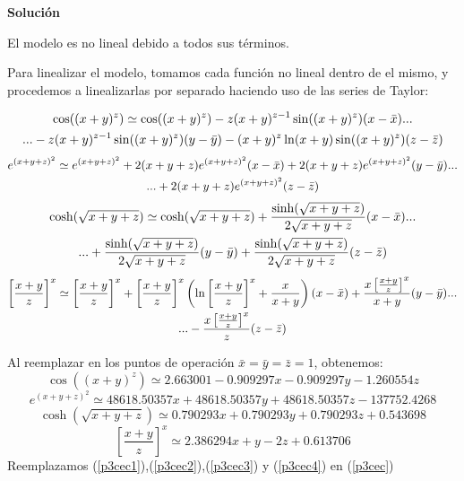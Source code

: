\documentclass[letterpaper, 12pt]{article}
\begin{document}
\begin{enumerate}
\begin{enumerate}
\textbf{Solución}

El modelo es no lineal debido a todos sus términos.

Para linealizar el modelo, tomamos cada función no lineal dentro de el mismo, y procedemos a linealizarlas por separado haciendo uso de las series de Taylor:

\begin{multline}
    \notag
    \cos((x+y)^z)\simeq \cos((x+y)^z)-z(x+y)^{z-1} \sin((x+y)^z)(x-\bar{x}) ...
    \\...-z(x+y)^{z-1} \sin((x+y)^z)(y-\bar{y})
    -(x+y)^z \ln(x+y) \sin((x+y)^z)(z-\bar{z})
\end{multline}
\begin{multline}
    \notag
    e^{(x+y+z)^2}\simeq e^{(x+y+z)^2}+2(x+y+z)e^{(x+y+z)^2}(x-\bar{x})+2(x+y+z)e^{(x+y+z)^2}(y-\bar{y})...
    \\...+2(x+y+z)e^{(x+y+z)^2}(z-\bar{z})
\end{multline}
\begin{multline}
    \notag
    \cosh(\sqrt{x+y+z})\simeq \cosh(\sqrt{x+y+z})+\frac{\sinh(\sqrt{x+y+z})}{2\sqrt{x+y+z}}(x-\bar{x})...
    \\...+\frac{\sinh(\sqrt{x+y+z})}{2\sqrt{x+y+z}}(y-\bar{y})+\frac{\sinh(\sqrt{x+y+z})}{2\sqrt{x+y+z}}(z-\bar{z})
\end{multline}
\begin{multline}
    \notag
    \left[\frac{x+y}{z}\right]^x\simeq \left[\frac{x+y}{z}\right]^x +\left[\frac{x+y}{z}\right]^x \left(\ln\left[\frac{x+y}{z}\right]^x+\frac{x}{x+y}\right)(x-\bar{x})+\frac{x\left[\frac{x+y}{z}\right]^x}{x+y}(y-\bar{y})...
    \\ ...-\frac{x\left[\frac{x+y}{z}\right]^x}{z}(z-\bar{z})
\end{multline}

 Al reemplazar en los puntos de operación $ \bar{x} = \bar{y} = \bar{z} = 1$, obtenemos: 
\begin{equation}
    \cos((x+y)^z)\simeq 2.663001-0.909297x-0.909297y-1.260554z
    \label{p3cec1}
\end{equation}
\begin{equation}
     e^{(x+y+z)^2}\simeq 48618.50357x+48618.50357y+48618.50357z-137752.4268
     \label{p3cec2}
\end{equation}
\begin{equation}
     \cosh(\sqrt{x+y+z})\simeq 0.790293x+0.790293y+0.790293z+0.543698
     \label{p3cec3}
\end{equation}
\begin{equation}
     \left[\frac{x+y}{z}\right]^x\simeq 2.386294x+y-2z+0.613706
     \label{p3cec4}
\end{equation}
Reemplazamos (\ref{p3cec1}),(\ref{p3cec2}),(\ref{p3cec3}) y (\ref{p3cec4}) en (\ref{p3cec})


\end{enumerate}
\end{enumerate}
\end{document}
